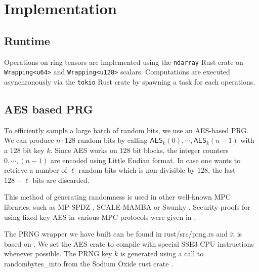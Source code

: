 \section{Implementation}


\subsection{Runtime}

Operations on ring tensors are implemented using the \texttt{ndarray} Rust crate on
\texttt{Wrapping<u64>} and \texttt{Wrapping<u128>} scalars. Computations are executed
asynchronously via the \texttt{tokio} Rust crate by spawning a task for each operations.


\subsection{AES based PRG}
\label{sec:aes}

To efficiently sample a large batch of random bits, we use an AES-based PRG. We can produce $n \cdot 128$ random bits by calling $\mathsf{AES}_k(0), \cdots, \mathsf{AES}_k(n-1)$ with a $128$ bit key $k$.
Since AES works on $128$ bit blocks, the integer counters $0, \cdots, (n-1)$
are encoded using Little Endian format. In case one wants to retrieve a
number of $\ell$ random bits which is non-divisible by $128$, the last
$128 - \ell$ bits are discarded.

This method of generating
randomness is used in other well-known MPC libraries, such as MP-SPDZ
\cite{CCS:Keller20}, SCALE-MAMBA \cite{SCALE} or Swanky \cite{url-swanky}.
Security proofs for using fixed key AES in various MPC protocols were given
in \cite{SP:GKWY20}.

The PRNG wrapper we have built can be found in \textsf{rust/src/prng.rs} and
it is based on \cite{url-cargo-aes}.  We set the \textsf{AES} crate to
compile with special SSE3 CPU instructions whenever possible.
The PRNG key $k$ is generated using a call to \textsf{randombytes\_into}
from the Sodium Oxide rust crate \cite{url-sodiumoxide}.


